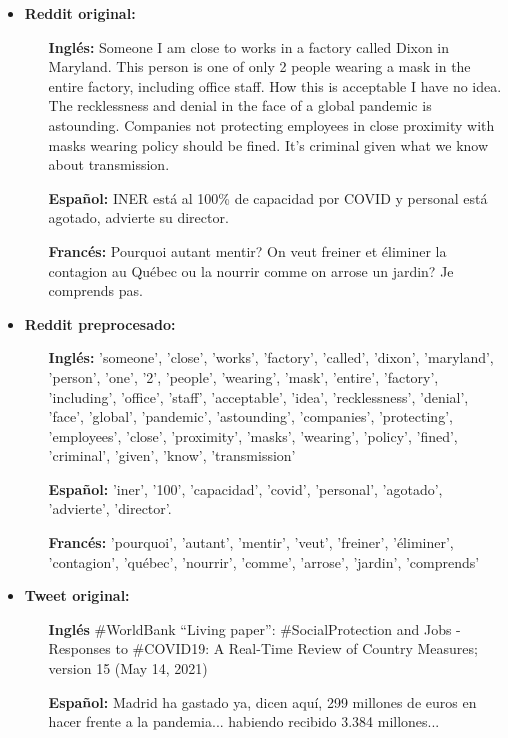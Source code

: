 \begin{itemize}
    \item \textbf{Reddit original:}
    \begin{itemize}
        \item [\textbf{Inglés:}] Someone I am close to works in a factory called Dixon in Maryland. This person is one of only 2 people wearing a mask in the entire factory, including office staff. How this is acceptable I have no idea. The recklessness and denial in the face of a global pandemic is astounding. Companies not protecting employees in close proximity with masks wearing policy should be fined. It's criminal given what we know about transmission.
        \item [\textbf{Español:}] INER está al 100\% de capacidad por COVID y personal está agotado, advierte su director.
        \item [\textbf{Francés:}] Pourquoi autant mentir? On veut freiner et éliminer la contagion au Québec ou la nourrir comme on arrose un jardin? Je comprends pas.
    \end{itemize}
    \item \textbf{Reddit preprocesado:}
    \begin{itemize}
        \item [\textbf{Inglés:}] 'someone', 'close', 'works', 'factory', 'called', 'dixon', 'maryland', 'person', 'one', '2', 'people', 'wearing', 'mask', 'entire', 'factory', 'including', 'office', 'staff', 'acceptable', 'idea', 'recklessness', 'denial', 'face', 'global', 'pandemic', 'astounding', 'companies', 'protecting', 'employees', 'close', 'proximity', 'masks', 'wearing', 'policy', 'fined', 'criminal', 'given', 'know', 'transmission'
        \item [\textbf{Español:}]'iner', '100', 'capacidad', 'covid', 'personal', 'agotado', 'advierte', 'director'.
        \item [\textbf{Francés:}] 'pourquoi', 'autant', 'mentir', 'veut', 'freiner', 'éliminer', 'contagion', 'québec', 'nourrir', 'comme', 'arrose', 'jardin', 'comprends'
    \end{itemize}
    \item \textbf{Tweet original:}
    \begin{itemize}
        \item [\textbf{Inglés}] \#WorldBank “Living paper”: \#SocialProtection and Jobs - Responses to \#COVID19: A Real-Time Review of Country Measures; version 15 (May 14, 2021)
        \item [\textbf{Español:}] Madrid ha gastado ya, dicen aquí, 299 millones de euros en hacer frente a la pandemia... habiendo recibido 3.384 millones...

\end{itemize}
\end{itemize}
